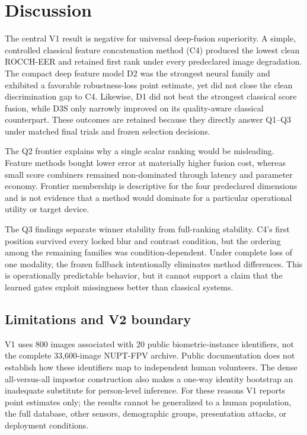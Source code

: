 \section{Discussion}
\label{sec:discussion}

The central V1 result is negative for universal deep-fusion superiority. A
simple, controlled classical feature concatenation method (C4) produced the
lowest clean ROCCH-EER and retained first rank under every predeclared image
degradation. The compact deep feature model D2 was the strongest neural family
and exhibited a favorable robustness-loss point estimate, yet did not close the
clean discrimination gap to C4. Likewise, D1 did not beat the strongest
classical score fusion, while D3S only narrowly improved on its quality-aware
classical counterpart. These outcomes are retained because they directly answer
Q1--Q3 under matched final trials and frozen selection decisions.

The Q2 frontier explains why a single scalar ranking would be misleading.
Feature methods bought lower error at materially higher fusion cost, whereas
small score combiners remained non-dominated through latency and parameter
economy. Frontier membership is descriptive for the four predeclared dimensions
and is not evidence that a method would dominate for a particular operational
utility or target device.

The Q3 findings separate winner stability from full-ranking stability. C4's
first position survived every locked blur and contrast condition, but the
ordering among the remaining families was condition-dependent. Under complete
loss of one modality, the frozen fallback intentionally eliminates method
differences. This is operationally predictable behavior, but it cannot support
a claim that the learned gates exploit missingness better than classical
systems.

\subsection{Limitations and V2 boundary}

V1 uses 800 images associated with 20 public biometric-instance identifiers,
not the complete 33,600-image NUPT-FPV archive. Public documentation does not
establish how these identifiers map to independent human volunteers. The dense
all-versus-all impostor construction also makes a one-way identity bootstrap an
inadequate substitute for person-level inference. For these reasons V1 reports
point estimates only; the results cannot be generalized to a human population,
the full database, other sensors, demographic groups, presentation attacks, or
deployment conditions.

